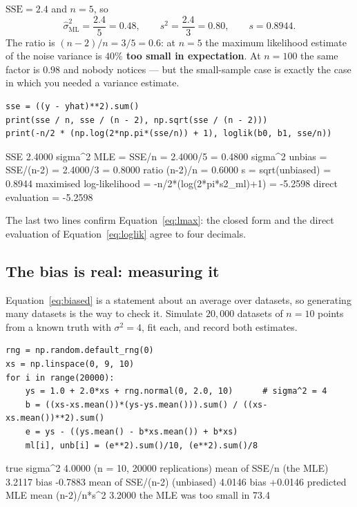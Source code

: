 \documentclass[11pt]{article}
\begin{document}
\begin{worked}
$\mathrm{SSE} = 2.4$ and $n = 5$, so
\[
  \hat\sigma^2_{\mathrm{ML}} = \frac{2.4}{5} = 0.48,
  \qquad
  s^2 = \frac{2.4}{3} = 0.80,
  \qquad
  s = 0.8944 .
\]
The ratio is $(n-2)/n = 3/5 = 0.6$: at $n = 5$ the maximum likelihood estimate
of the noise variance is \textbf{$40\%$ too small in expectation}. At $n = 100$
the same factor is $0.98$ and nobody notices --- but the small-sample case is
exactly the case in which you needed a variance estimate.
\end{worked}

\begin{lstlisting}
sse = ((y - yhat)**2).sum()
print(sse / n, sse / (n - 2), np.sqrt(sse / (n - 2)))
print(-n/2 * (np.log(2*np.pi*(sse/n)) + 1), loglik(b0, b1, sse/n))
\end{lstlisting}
\begin{codeout}
SSE            2.4000
sigma^2 MLE    = SSE/n     = 2.4000/5 = 0.4800
sigma^2 unbias = SSE/(n-2) = 2.4000/3 = 0.8000
ratio (n-2)/n  = 0.6000       s = sqrt(unbiased) = 0.8944
maximised log-likelihood = -n/2*(log(2*pi*s2_ml)+1) = -5.2598
direct evaluation                                   = -5.2598
\end{codeout}

The last two lines confirm Equation~\eqref{eq:lmax}: the closed form and the
direct evaluation of Equation~\eqref{eq:loglik} agree to four decimals.

\subsection{The bias is real: measuring it}
\label{sec:biasmeasured}

Equation~\eqref{eq:biased} is a statement about an average over datasets, so
generating many datasets is the way to check it. Simulate $20{,}000$ datasets
of $n = 10$ points from a known truth with $\sigma^2 = 4$, fit each, and record
both estimates.

\begin{lstlisting}
rng = np.random.default_rng(0)
xs = np.linspace(0, 9, 10)
for i in range(20000):
    ys = 1.0 + 2.0*xs + rng.normal(0, 2.0, 10)      # sigma^2 = 4
    b = ((xs-xs.mean())*(ys-ys.mean())).sum() / ((xs-xs.mean())**2).sum()
    e = ys - ((ys.mean() - b*xs.mean()) + b*xs)
    ml[i], unb[i] = (e**2).sum()/10, (e**2).sum()/8
\end{lstlisting}
\begin{codeout}
true sigma^2                    4.0000   (n = 10, 20000 replications)
mean of SSE/n     (the MLE)     3.2117   bias -0.7883
mean of SSE/(n-2) (unbiased)    4.0146   bias +0.0146
predicted MLE mean (n-2)/n*s^2  3.2000
the MLE was too small in 73.4%
\end{codeout}
\end{document}
